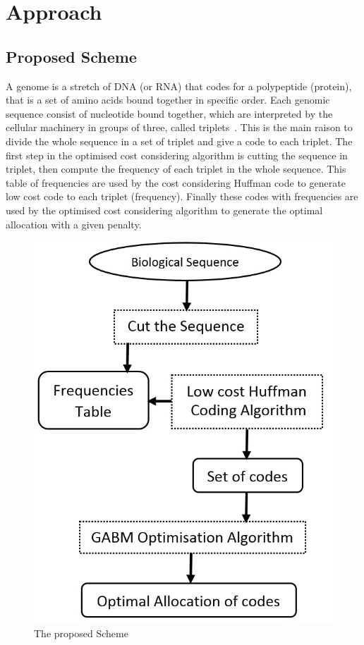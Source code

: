 \documentclass[preprint,12pt]{elsarticle}
\begin{document}
\section{Approach}
\label{sec3}
\subsection{Proposed Scheme}

A genome is a stretch of DNA (or RNA) that codes for a polypeptide (protein), that is a set of amino acids bound together in specific order. Each genomic sequence consist of nucleotide bound together, which are interpreted by the cellular machinery in groups of three, called triplets~\cite{}. This is the main raison to divide the whole sequence in a set of triplet and give a code to each triplet. The first step in the optimised cost considering algorithm is cutting the sequence in triplet, then compute the frequency of each triplet in the whole sequence. This table of frequencies are used by the cost considering Huffman code to generate low cost code to each triplet (frequency). Finally these codes with frequencies are used by the optimised cost considering algorithm to generate the optimal allocation with a given  penalty.

\begin{figure}[h]
\begin{center}
\includegraphics[scale=0.5]{Images/Drawing3.jpg}
\caption{The proposed Scheme}
\end{center}
\label{Fig1}
\end{figure}
\end{document}
